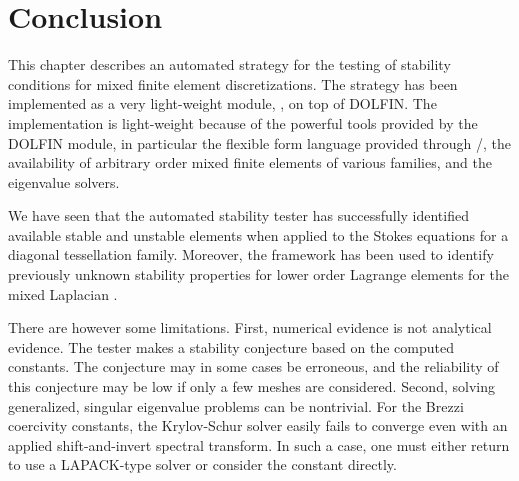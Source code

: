 \section{Conclusion}
\label{rognes:sec:conclusion}

This chapter describes an automated strategy for the testing of stability
conditions for mixed finite element discretizations. The strategy has
been implemented as a very light-weight \rognespython{} module,
\rognesascot{}, on top of DOLFIN. The implementation is
light-weight because of the powerful tools provided by the DOLFIN
module, in particular the flexible form language provided through
\ufl{}/\ffc{}, the availability of arbitrary order mixed finite
elements of various families, and the \slepc{} eigenvalue solvers.

We have seen that the automated stability tester has successfully
identified available stable and unstable elements when applied to the
Stokes equations for a diagonal tessellation family. Moreover, the
framework has been used to identify previously unknown stability
properties for lower order Lagrange elements for the mixed
Laplacian \citep{ArnoldRognes2009}.

There are however some limitations. First, numerical evidence is not
analytical evidence. The tester makes a stability conjecture based on
the computed constants. The conjecture may in some cases be erroneous,
and the reliability of this conjecture may be low if only a few meshes
are considered. Second, solving generalized, singular eigenvalue
problems can be nontrivial. For the Brezzi coercivity constants, the
Krylov-Schur solver easily fails to converge even with an applied
shift-and-invert spectral transform. In such a case, one must either
return to use a LAPACK-type solver or consider the \babuska{} constant
directly.
